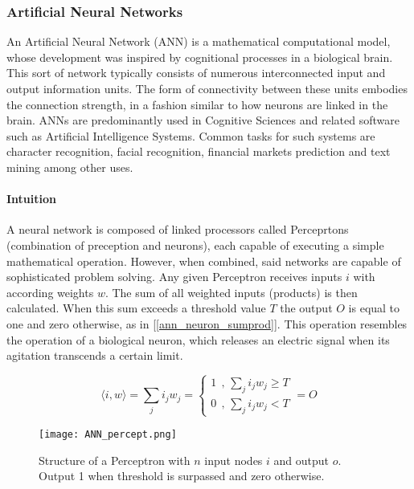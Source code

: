 \subsubsection{Artificial Neural Networks}
	An Artificial Neural Network (ANN) \cite{mcculloch1943logical} is a mathematical computational model, whose development was inspired by cognitional processes in a biological brain. This sort of network typically consists of numerous interconnected input and output information units. The form of connectivity between these units embodies the connection strength, in a fashion similar to how neurons are linked in the brain. ANNs are predominantly used in Cognitive Sciences and related software such as Artificial Intelligence Systems. Common tasks for such systems are character recognition, facial recognition, financial markets prediction and text mining among other uses.
	
	\paragraph{Intuition}
		A neural network is composed of linked processors called Perceprtons (combination of preception and neurons), each capable of executing a simple mathematical operation. However, when combined, said networks are capable of sophisticated problem solving. Any given Perceptron receives inputs $ i $ with according weights $ w $. The sum of all weighted inputs (products) is then calculated. When this sum exceeds a threshold value $ T $ the output $ O $ is equal to one and zero otherwise, as in [\ref{ann_neuron_sumprod}]. This operation resembles the operation of a biological neuron, which releases an electric signal when its agitation transcends a certain limit.
	
	\begin{equation}
		\langle i,w \rangle = \sum_j i_j w_j = 
			\begin{cases}
				1 \ \ \text{,  } \sum_j i_j w_j \geq T \\
				0 \ \ \text{,  } \sum_j i_j w_j < T 
			\end{cases}
		 = O
		\label{ann_neuron_sumprod}
	\end{equation}
	
	\begin{figure}[h]
		\centering
		\captionsetup{width=0.8\textwidth}
		\texttt{[image: ANN\_percept.png]}
		\caption[ANN Perceptron]{
			\footnotesize{
				Structure of a Perceptron with $ n $ input nodes $ i $ and output $ o $. Output 1 when threshold is surpassed and zero otherwise.
			}
		} 
		\label{ANN_percept}
	\end{figure}
	
